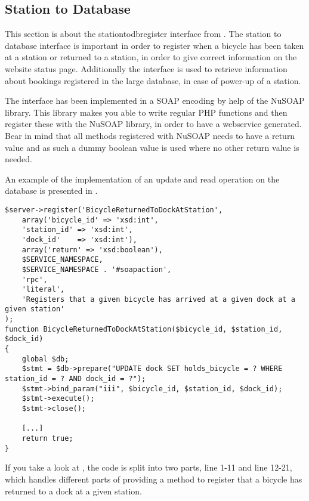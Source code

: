 \subsection{Station to Database}\label{sec:stationToWebI}
This section is about the stationtodbregister interface from .
The station to database interface is important in order to register when a bicycle has been taken at a station or returned to a station, in order to give correct information on the website status page.
Additionally the interface is used to retrieve information about bookings registered in the large database, in case of power-up of a station.

The interface has been implemented in a SOAP encoding by help of the NuSOAP library\citep{misc:nusoap}.
This library makes you able to write regular PHP functions and then register these with the NuSOAP library, in order to have a webservice generated.
Bear in mind that all methods registered with NuSOAP needs to have a return value and as such a dummy boolean value is used where no other return value is needed.

An example of the implementation of an update and read operation on the database is presented in .

\begin{minipage}{\textwidth}
\begin{lstlisting}[caption = {Method for registering a bicycle as been returned to a dock at a given station.}, label = {lst:bicycledockstationreturned}]
$server->register('BicycleReturnedToDockAtStation',
	array('bicycle_id' => 'xsd:int',
	'station_id' => 'xsd:int',
	'dock_id'    => 'xsd:int'),
	array('return' => 'xsd:boolean'),
	$SERVICE_NAMESPACE,
	$SERVICE_NAMESPACE . '#soapaction',
	'rpc',
	'literal',
	'Registers that a given bicycle has arrived at a given dock at a given station'
);
function BicycleReturnedToDockAtStation($bicycle_id, $station_id, $dock_id)
{
	global $db;
	$stmt = $db->prepare("UPDATE dock SET holds_bicycle = ? WHERE station_id = ? AND dock_id = ?");
	$stmt->bind_param("iii", $bicycle_id, $station_id, $dock_id);
	$stmt->execute();
	$stmt->close();
	
	[...]
	return true;
}
\end{lstlisting}
\end{minipage}

If you take a look at , the code is split into two parts, line 1-11 and line 12-21, which handles different parts of providing a method to register that a bicycle has returned to a dock at a given station.

